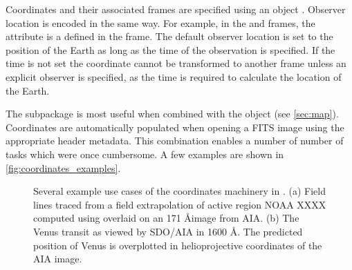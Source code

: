 Coordinates and their associated frames are specified using an \astropy {} object \citep[see Section 3.3 of][]{astropy2018}.
Observer location is encoded in the same way.
For example, in the \hpc and \hcc frames, the  attribute is a  defined in the \hgs frame.
The default observer location is set to the position of the Earth as long as the time of the observation is specified.
If the time is not set the coordinate cannot be transformed to another frame unless an explicit observer is specified, as the time is required to calculate the location of the Earth.

The  subpackage is most useful when combined with the  object (see \autoref{sec:map}).
Coordinates are automatically populated when opening a FITS image using the appropriate header metadata.
This combination enables a number of number of tasks which were once cumbersome.
A few examples are shown in \autoref{fig:coordinates_examples}.


\begin{figure}
    \caption{Several example use cases of the coordinates machinery in \sunpy.
    (a) Field lines traced from a field extrapolation of active region NOAA XXXX computed using  overlaid on an 171 \AA image from AIA. (b) The Venus transit as viewed by SDO/AIA in 1600 \AA. The predicted position of Venus is overplotted in helioprojective coordinates of the AIA image.}
    \label{fig:coordinates_examples}
\end{figure}




